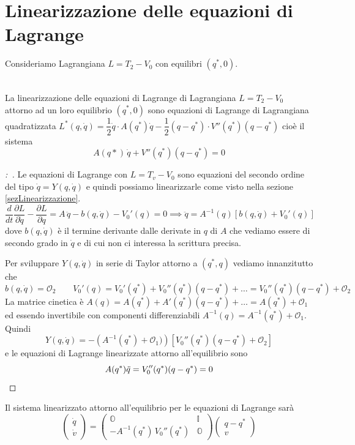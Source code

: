 \documentclass[11pt,a4paper,twoside]{book}
\newenvironment{proposizione}[1][\empty]{\begin{Proposizione}{
\ifx\empty#1\relax\else\mdseries\itshape#1\\\fi
}{}}{\end{Proposizione}}
\newenvironment{dimo}[1][\proofname]{
	\begin{tcolorbox}[
	breakable, 
	enhanced, 
	interior hidden, 
	frame hidden, 
	borderline west = {1pt}{0pt}{gray}, 
	top=0pt, bottom=0pt, left=0pt]
\begin{proof}[#1:~]
}
{
\end{proof}
\end{tcolorbox}
}
\theoremstyle{esss}
\theoremstyle{dotless}
\numberwithin{equation}{section} %
\begin{document}
\section{Linearizzazione delle equazioni di Lagrange}
Consideriamo Lagrangiana $L=T_2-V_0$ con equilibri $(q^*,0)$.

\begin{proposizione}
La linearizzazione delle equazioni di Lagrange di Lagrangiana $L=T_2-V_0$ attorno ad un loro equilibrio $(q^*,0)$ sono equazioni di Lagrange di Lagrangiana quadratizzata $L^*(q,\dot{q})=\dfrac{1}{2}\dot{q}\cdot A(q^*)\dot{q} - \dfrac{1}{2} (q-q^*)\cdot V''(q^*)(q-q^*)$ cioè il sistema
\[
A(q*)\,\dot{q}+V''(q^*)(q-q^*)=0
\]
\end{proposizione}
\begin{dimo}
Le equazioni di Lagrange con $L=T_v-V_0$ sono equazioni del secondo ordine del tipo $\dot{q}=Y(q,\dot{q})$ e quindi possiamo linearizzarle come visto nella sezione \ref{sezLinearizzazione}. 
\[
\dfrac{d}{dt}\dfrac{\partial L}{\partial \dot{q}}-\dfrac{\partial L}{\partial q}=A\,\ddot{q}-b(q,\dot{q})-V_0'(q)=0 \implies \ddot{q}=A^{-1}(q)\left[ b(q,\dot{q}) + V_0'(q)\right]
\]
dove $b(q,\dot{q})$ è il termine derivante dalle derivate in $q$ di $A$ che vediamo essere di secondo grado in $\dot{q}$ e di cui non ci interessa la scrittura precisa. 

Per sviluppare $Y(q,\dot{q})$ in serie di Taylor attorno a $(q^*,q)$ vediamo innanzitutto che
\[
b(q,\dot{q})=\mathcal{O}_2 \qquad V_0'(q)=V_0'(q^*)+V_0''(q^*)(q-q^*)+\dots=V_0''(q^*)(q-q^*)+\mathcal{O}_2
\]
La matrice cinetica è $A(q)=A(q^*)+A'(q^*)(q-q^*)+\dots=A(q^*)+\mathcal{O}_1$ ed essendo invertibile con componenti differenziabili $A^{-1}(q)=A^{-1}(q^*)+\mathcal{O}_1$.
Quindi
\[
Y(q,\dot{q})=-\left(A^{-1}(q^*)+\mathcal{O}_1)\right) \left[ V_0''(q^*)(q-q^*)+\mathcal{O}_2 \right]
\] e le equazioni di Lagrange linearizzate attorno all'equilibrio sono
\begin{equation}
A(q^*)\ddot{q}=V_0''(q^*)(q-q^*)=0 \qedhere
\end{equation}
\end{dimo}

Il sistema linearizzato attorno all'equilibrio per le equazioni di Lagrange sarà
\begin{equation}
\left(\begin{array}{c}
\dot{q}\\
\dot{v}
\end{array}\right)=\left(\begin{array}{cc}
\mathbb{O} & \mathbb{I} \\
-A^{-1}(q^*)\,V_0''(q^*) & \mathbb{O}
\end{array}\right)\left(\begin{array}{c}
q-q^*\\
v
\end{array}\right)
\end{equation}
\end{document}
